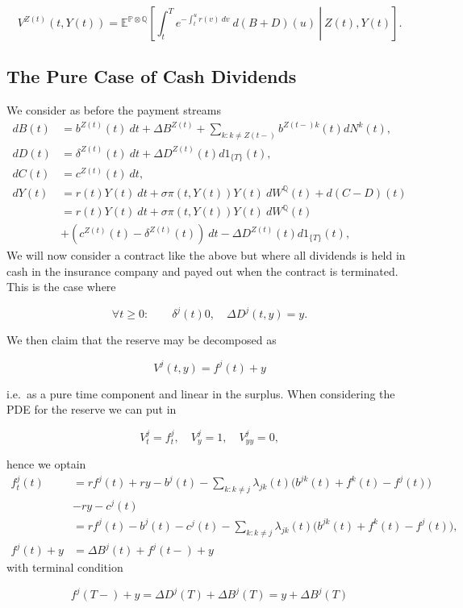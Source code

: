 \documentclass[a4paper,10pt,openany]{book}
\begin{document}
\[
V^{Z(t)}(t,Y(t))=\mathbb E^{\mathbb P\otimes\mathbb Q}\left[\left. \int_t^Te^{-\int_t^u r(v)\ dv}\ d(B+D)(u)\ \right\vert\ Z(t),Y(t)\right].
\]

\hypertarget{the-pure-case-of-cash-dividends}{%
\subsection{The Pure Case of Cash Dividends}\label{the-pure-case-of-cash-dividends}}

We consider as before the payment streams
\begin{align*}
dB(t)&=b^{Z(t)}(t)\ dt + \Delta B^{Z(t)}+\sum_{k:k\ne Z(t-)}b^{Z(t-)k}(t)dN^k(t),\\
dD(t)&=\delta^{Z(t)}(t)\ dt+\Delta D^{Z(t)}(t)d1_{\{T\}}(t),\\
dC(t)&=c^{Z(t)}(t)\ dt,\\
dY(t)&=r(t)Y(t)\ dt + \sigma\pi(t,Y(t)) Y(t)\ dW^\mathbb Q(t) + d(C-D)(t)\\
&=r(t)Y(t)\ dt + \sigma\pi(t,Y(t)) Y(t)\ dW^\mathbb Q(t)\\
&+(c^{Z(t)}(t)-\delta^{Z(t)}(t))\ dt-\Delta D^{Z(t)}(t)d1_{\{T\}}(t),
\end{align*}
We will now consider a contract like the above but where all dividends is held in cash in the insurance company and payed out when the contract is terminated. This is the case where

\[
\forall t\ge 0:\qquad\delta^j(t)0,\quad\Delta D^j(t,y)=y.
\]

We then claim that the reserve may be decomposed as

\[
V^j(t,y)=f^j(t)+y
\]

i.e.~as a pure time component and linear in the surplus. When considering the PDE for the reserve we can put in

\[
V_t^j=f_t^j,\quad V_y^j=1,\quad V_{yy}^j=0,
\]

hence we optain
\begin{align*}
f_t^j(t)&=rf^j(t)+ry-b^j(t)-\sum_{k:k\ne j}\lambda_{jk}(t)\Big(b^{jk}(t)+f^k(t)-f^j(t)\Big)\\
&-ry-c^j(t)\\
&=rf^j(t)-b^j(t)-c^j(t)-\sum_{k:k\ne j}\lambda_{jk}(t)\Big(b^{jk}(t)+f^k(t)-f^j(t)\Big),\\
f^j(t)+y&=\Delta B^j(t)+f^j(t-)+y
\end{align*}
with terminal condition

\[
f^j(T-)+y=\Delta D^j(T)+\Delta B^j(T)=y+\Delta B^j(T)
\]
\end{document}
